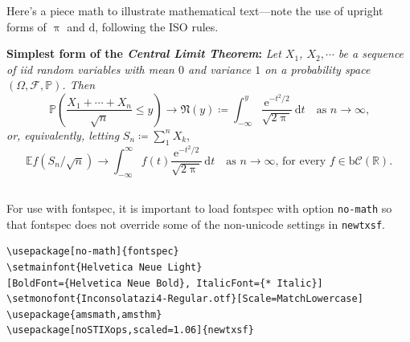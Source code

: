 \documentclass[11pt]{article}
\begin{document}
Here's a piece math to illustrate mathematical text---note the use of upright forms of $\uppi$ and $\mathrm{d}$, following the ISO rules.

\textbf{Simplest form of the \textit{Central Limit Theorem}:} \textit{Let
$X_1$, $X_2,\cdots$ be a sequence of iid random variables with mean $0$ 
and variance $1$ on a probability space $(\Omega,\mathcal{F},\mathbb{P})$. Then}
\[\mathbb{P}\left(\frac{X_1+\cdots+X_n}{\sqrt{n}}\le y\right)\to\mathfrak{N}(y)\coloneq
\int_{-\infty}^y \frac{\mathrm{e}^{-t^2/2}}{\sqrt{2\uppi}}\,
\mathrm{d}t\quad\mbox{as $n\to\infty$,}\]
\textit{or, equivalently, letting} $S_n\coloneq\sum_1^n X_k$,
\[\mathbb{E} f\left(S_n/\sqrt{n}\right)\to \int_{-\infty}^\infty f(t)
\frac{\mathrm{e}^{-t^2/2}}{\sqrt{2\uppi}}\,\mathrm{d}t
\quad\mbox{as $n\to\infty$, for every $f\in\mathrm{b}
\mathcal{C}(\mathbb{R})$.}\]
\subsection{}
For use with fontspec, it is important to load fontspec with option {\tt no-math} so that fontspec does not override some of the non-unicode settings in {\tt newtxsf}.
\begin{verbatim}
\usepackage[no-math]{fontspec}
\setmainfont{Helvetica Neue Light}
[BoldFont={Helvetica Neue Bold}, ItalicFont={* Italic}]
\setmonofont{Inconsolatazi4-Regular.otf}[Scale=MatchLowercase]
\usepackage{amsmath,amsthm}
\usepackage[noSTIXops,scaled=1.06]{newtxsf}
\end{verbatim}
\end{document}
